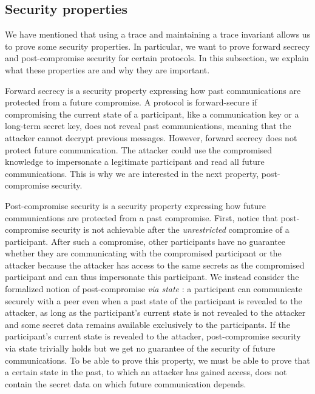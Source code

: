 \subsection{Security properties}
\label{sec:security-properties-def}

We have mentioned that using a trace and maintaining a trace invariant allows us to prove some security properties.
In particular, we want to prove forward secrecy and post-compromise security for certain protocols. In this subsection, we explain what these properties are and why they are important.

Forward secrecy is a security property expressing how past communications are protected from a future compromise.
A protocol is forward-secure if compromising the current state of a participant, like a communication key or a long-term secret key, does not reveal past communications, meaning that the attacker cannot decrypt previous messages.
However, forward secrecy does not protect future communication. The attacker could use the compromised knowledge to impersonate a legitimate participant and read all future communications.
This is why we are interested in the next property, post-compromise security.

Post-compromise security is a security property expressing how future communications are protected from a past compromise.
First, notice that post-compromise security is not achievable after the \emph{unrestricted} compromise of a participant.
After such a compromise, other participants have no guarantee whether they are communicating with the compromised participant or the attacker because the attacker has access to the same secrets as the compromised participant and can thus impersonate this participant.
We instead consider the formalized notion of post-compromise \emph{via state} \cite{}:
a participant can communicate securely with a peer even when a past state of the participant is revealed to the attacker, as long as the participant's current state is not revealed to the attacker and some secret data remains available exclusively to the participants.
If the participant's current state is revealed to the attacker, post-compromise security via state trivially holds but we get no guarantee of the security of future communications.
To be able to prove this property, we must be able to prove that a certain state in the past, to which an attacker has gained access, does not contain the secret data on which future communication depends.

